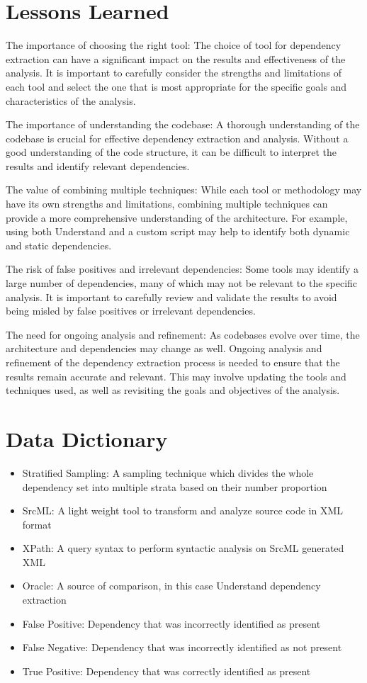 \documentclass[12pt, dvipsnames, a4paper]{article}
\begin{document}
\section{Lessons Learned}
The importance of choosing the right tool: The choice of tool for dependency extraction can have a significant impact on the results and effectiveness of the analysis. It is important to carefully consider the strengths and limitations of each tool and select the one that is most appropriate for the specific goals and characteristics of the analysis.

The importance of understanding the codebase: A thorough understanding of the codebase is crucial for effective dependency extraction and analysis. Without a good understanding of the code structure, it can be difficult to interpret the results and identify relevant dependencies.

The value of combining multiple techniques: While each tool or methodology may have its own strengths and limitations, combining multiple techniques can provide a more comprehensive understanding of the architecture. For example, using both Understand and a custom script may help to identify both dynamic and static dependencies.

The risk of false positives and irrelevant dependencies: Some tools may identify a large number of dependencies, many of which may not be relevant to the specific analysis. It is important to carefully review and validate the results to avoid being misled by false positives or irrelevant dependencies.

The need for ongoing analysis and refinement: As codebases evolve over time, the architecture and dependencies may change as well. Ongoing analysis and refinement of the dependency extraction process is needed to ensure that the results remain accurate and relevant. This may involve updating the tools and techniques used, as well as revisiting the goals and objectives of the analysis.
\clearpage
\section{Data Dictionary}
\begin{itemize}
	\item{Stratified Sampling: A sampling technique which divides the whole dependency set into multiple strata based on their number proportion}
	\item {SrcML: A light weight tool to transform and analyze source code in XML format}
	\item {XPath: A query syntax to perform syntactic analysis on SrcML generated XML}
	\item {Oracle: A source of comparison, in this case Understand dependency extraction}
	\item {False Positive: Dependency that was incorrectly identified as present}
	\item {False Negative: Dependency that was incorrectly identified as not present}
	\item {True Positive: Dependency that was correctly identified as present}
\end{itemize}
\end{document}
